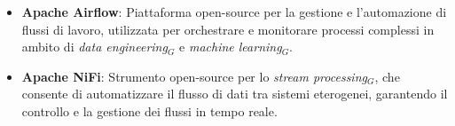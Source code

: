 \begin{itemize}
    \item \textbf{Apache Airflow}: Piattaforma open-source per la gestione e l'automazione di flussi di lavoro, utilizzata per orchestrare e monitorare processi complessi in ambito di \textit{data engineering$_G$} e \textit{machine learning$_G$}.
    \item \textbf{Apache NiFi}: Strumento open-source per lo \textit{stream processing$_G$}, che consente di automatizzare il flusso di dati tra sistemi eterogenei, garantendo il controllo e la gestione dei flussi in tempo reale.
\end{itemize}
